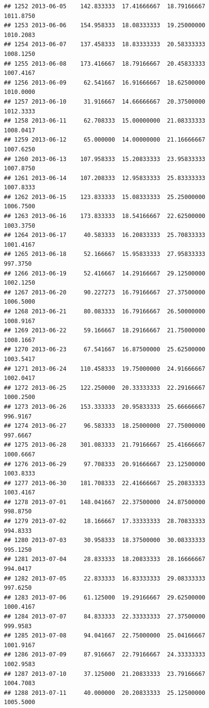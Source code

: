 \documentclass[
]{article}
\begin{document}
\begin{verbatim}
## 1252 2013-06-05    142.833333  17.41666667  18.79166667    1011.8750
## 1253 2013-06-06    154.958333  18.08333333  19.25000000    1010.2083
## 1254 2013-06-07    137.458333  18.83333333  20.58333333    1008.1250
## 1255 2013-06-08    173.416667  18.79166667  20.45833333    1007.4167
## 1256 2013-06-09     62.541667  16.91666667  18.62500000    1010.0000
## 1257 2013-06-10     31.916667  14.66666667  20.37500000    1012.3333
## 1258 2013-06-11     62.708333  15.00000000  21.08333333    1008.0417
## 1259 2013-06-12     65.000000  14.00000000  21.16666667    1007.6250
## 1260 2013-06-13    107.958333  15.20833333  23.95833333    1007.8750
## 1261 2013-06-14    107.208333  12.95833333  25.83333333    1007.8333
## 1262 2013-06-15    123.833333  15.08333333  25.25000000    1006.7500
## 1263 2013-06-16    173.833333  18.54166667  22.62500000    1003.3750
## 1264 2013-06-17     40.583333  16.20833333  25.70833333    1001.4167
## 1265 2013-06-18     52.166667  15.95833333  27.95833333     997.3750
## 1266 2013-06-19     52.416667  14.29166667  29.12500000    1002.1250
## 1267 2013-06-20     90.227273  16.79166667  27.37500000    1006.5000
## 1268 2013-06-21     80.083333  16.79166667  26.50000000    1008.9167
## 1269 2013-06-22     59.166667  18.29166667  21.75000000    1008.1667
## 1270 2013-06-23     67.541667  16.87500000  25.62500000    1003.5417
## 1271 2013-06-24    110.458333  19.75000000  24.91666667    1002.0417
## 1272 2013-06-25    122.250000  20.33333333  22.29166667    1000.2500
## 1273 2013-06-26    153.333333  20.95833333  25.66666667     996.9167
## 1274 2013-06-27     96.583333  18.25000000  27.75000000     997.6667
## 1275 2013-06-28    301.083333  21.79166667  25.41666667    1000.6667
## 1276 2013-06-29     97.708333  20.91666667  23.12500000    1003.8333
## 1277 2013-06-30    181.708333  22.41666667  25.20833333    1003.4167
## 1278 2013-07-01    148.041667  22.37500000  24.87500000     998.8750
## 1279 2013-07-02     18.166667  17.33333333  28.70833333     994.8333
## 1280 2013-07-03     30.958333  18.37500000  30.08333333     995.1250
## 1281 2013-07-04     28.833333  18.20833333  28.16666667     994.0417
## 1282 2013-07-05     22.833333  16.83333333  29.08333333     997.6250
## 1283 2013-07-06     61.125000  19.29166667  29.62500000    1000.4167
## 1284 2013-07-07     84.833333  22.33333333  27.37500000     999.9583
## 1285 2013-07-08     94.041667  22.75000000  25.04166667    1001.9167
## 1286 2013-07-09     87.916667  22.79166667  24.33333333    1002.9583
## 1287 2013-07-10     37.125000  21.20833333  23.79166667    1004.7083
## 1288 2013-07-11     40.000000  20.20833333  25.12500000    1005.5000

\end{verbatim}
\end{document}
